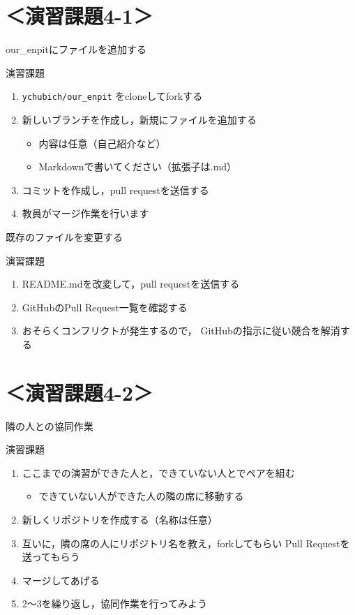 \documentclass[t, aspectratio=169]{beamer}
\begin{document}
\section{＜演習課題4-1＞}
\label{sec-4-4}
\begin{frame}[fragile,label=sec-4-4-1]{our\_enpitにファイルを追加する}
 \begin{block}{演習課題}
\begin{enumerate}
\item \texttt{ychubich/our\_enpit} をcloneしてforkする
\item 新しいブランチを作成し，新規にファイルを追加する
\begin{itemize}
\item 内容は任意（自己紹介など）
\item Markdownで書いてください（拡張子は.md）
\end{itemize}
\item コミットを作成し，pull requestを送信する
\item 教員がマージ作業を行います
\end{enumerate}
\end{block}
\end{frame}

\begin{frame}[label=sec-4-4-2]{既存のファイルを変更する}
\begin{block}{演習課題}
\begin{enumerate}
\item README.mdを改変して，pull requestを送信する
\item GitHubのPull Request一覧を確認する
\item おそらくコンフリクトが発生するので，
GitHubの指示に従い競合を解消する
\end{enumerate}
\end{block}
\end{frame}

\section{＜演習課題4-2＞}
\label{sec-4-5}
\begin{frame}[label=sec-4-5-1]{隣の人との協同作業}
\begin{block}{演習課題}
\begin{enumerate}
\item ここまでの演習ができた人と，できていない人とでペアを組む
\begin{itemize}
\item できていない人ができた人の隣の席に移動する
\end{itemize}
\item 新しくリポジトリを作成する（名称は任意）
\item 互いに，隣の席の人にリポジトリ名を教え，forkしてもらい
Pull Requestを送ってもらう
\item マージしてあげる
\item 2〜3を繰り返し，協同作業を行ってみよう
\end{enumerate}
\end{block}
\end{frame}
\end{document}
